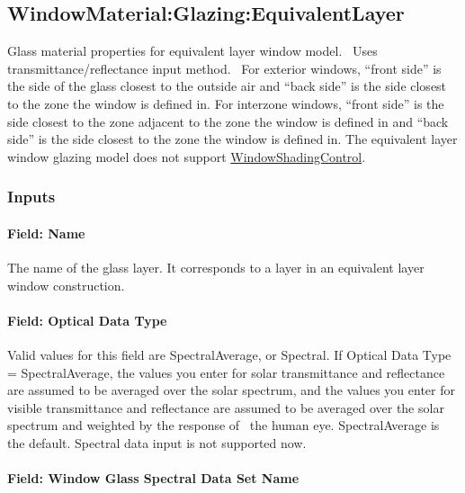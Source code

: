 \subsection{WindowMaterial:Glazing:EquivalentLayer}\label{windowmaterialglazingequivalentlayer}

Glass material properties for equivalent layer window model.~ Uses transmittance/reflectance input method.~ For exterior windows, ``front side'' is the side of the glass closest to the outside air and ``back side'' is the side closest to the zone the window is defined in. For interzone windows, ``front side'' is the side closest to the zone adjacent to the zone the window is defined in and ``back side'' is the side closest to the zone the window is defined in. The equivalent layer window glazing model does not support \hyperref[windowpropertyshadingcontrol]{WindowShadingControl}.

\subsubsection{Inputs}\label{inputs-30-001}

\paragraph{Field: Name}\label{field-name-24-002}

The name of the glass layer. It corresponds to a layer in an equivalent layer window construction.

\paragraph{Field: Optical Data Type}\label{field-optical-data-type-1}

Valid values for this field are SpectralAverage, or Spectral. If Optical Data Type = SpectralAverage, the values you enter for solar transmittance and reflectance are assumed to be averaged over the solar spectrum, and the values you enter for visible transmittance and reflectance are assumed to be averaged over the solar spectrum and weighted by the response of~ the human eye. SpectralAverage is the default. Spectral data input is not supported now.

\paragraph{Field: Window Glass Spectral Data Set Name}\label{field-window-glass-spectral-data-set-name-0}

